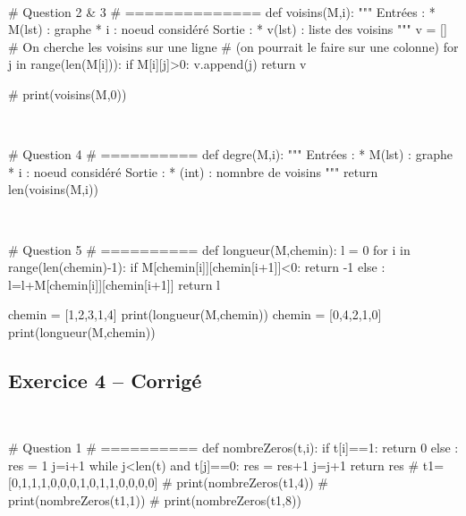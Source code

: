 \documentclass[10pt,fleqn]{article} %
\begin{document}
\begin{corrige}
$\quad$
\begin{python}
# Question 2 & 3
# ==============
def voisins(M,i):
    """
    Entrées : 
      * M(lst) : graphe
      * i : noeud considéré
    Sortie :
      * v(lst) : liste des voisins
    """
    v = []
    # On cherche les voisins sur une ligne 
    # (on pourrait le faire sur une colonne)
    for j in range(len(M[i])):
        if M[i][j]>0:
            v.append(j)
    return v
    
# print(voisins(M,0))
\end{python}
\end{corrige}


\begin{corrige}
$\quad$
\begin{python}
# Question 4
# ==========
def degre(M,i):
    """
    Entrées : 
      * M(lst) : graphe
      * i : noeud considéré
    Sortie :
      * (int) : nomnbre de voisins
    """
    return len(voisins(M,i))
\end{python}
\end{corrige}

\begin{corrige}
$\quad$
\begin{python}
# Question 5
# ==========
def longueur(M,chemin):
    l = 0
    for i in range(len(chemin)-1):
        if M[chemin[i]][chemin[i+1]]<0:
            return -1
        else :
            l=l+M[chemin[i]][chemin[i+1]]
    return l
    
chemin = [1,2,3,1,4]
print(longueur(M,chemin))        
chemin = [0,4,2,1,0]
print(longueur(M,chemin))
\end{python}
\end{corrige}

\vfill

{}
\subsection*{Exercice 4 -- Corrigé}
\begin{corrige}
$\quad$
\begin{python}
# Question 1 
# ==========
def nombreZeros(t,i):
    if t[i]==1:
        return 0
    else : 
        res = 1
        j=i+1
        while j<len(t) and t[j]==0:
            res = res+1
            j=j+1
    return res
# t1=[0,1,1,1,0,0,0,1,0,1,1,0,0,0,0]
# print(nombreZeros(t1,4))
# print(nombreZeros(t1,1))
# print(nombreZeros(t1,8))
\end{python}
\end{corrige}
\end{document}
